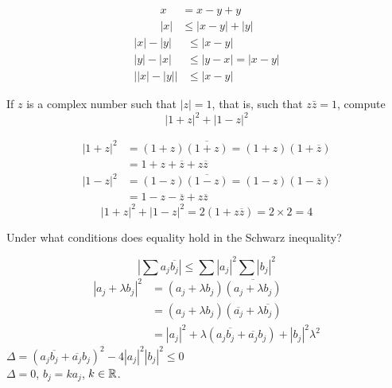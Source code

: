 \mySolve 
\begin{align*}
    x &= x - y + y \\
    |x| &\leq |x-y| + |y| 
\end{align*}
\begin{align*}
    |x| - |y| &\leq  |x-y| \\
    |y| - |x| &\leq  |y-x| = |x-y| \\
    \left| |x| - |y| \right| &\leq |x - y|
\end{align*}


\begin{myexercise}
    \label{ex:1.14}
    If $z$ is a complex number such that $|z| = 1$, that is, such that $z\bar{z} = 1$, compute
    \begin{equation*}
        |1+z|^2 + |1-z|^2
    \end{equation*}
\end{myexercise}

\mySolve
\begin{align*}
    |1+z|^2 &= (1+z)\overline{(1+z)} = (1+z)(1+\overline{z}) \\
    &= 1+z+\overline{z}+z\overline{z}
\end{align*}
\begin{align*}
    |1-z|^2 &= (1-z)\overline{(1-z)} = (1-z)(1-\overline{z}) \\
    &= 1-z-\overline{z}+z\overline{z}
\end{align*}
\begin{equation*}
    |1+z|^2 + |1-z|^2 = 2(1+z\overline{z}) = 2\times 2 = 4
\end{equation*}


\begin{myexercise}
    \label{ex:1.15}
    Under what conditions does equality hold in the Schwarz inequality?
\end{myexercise}

\mySolve
\begin{equation*}
    \left|\sum a_j \overline{b_j}\right| \leq \sum |a_j|^2 \sum |b_j|^2 
\end{equation*}
\begin{align*}
    |a_j + \lambda b_j|^2 
    &= (a_j + \lambda b_j) \overline{(a_j + \lambda b_j)} \\
    &= (a_j + \lambda b_j) (\overline{a_j} + \lambda \overline{b_j}) \\
    &= |a_j|^2 + \lambda (a_j \overline{b_j} + \overline{a_j} b_j) + |b_j|^2 \lambda^2 
\end{align*}
$\Delta = (a_j \overline{b_j} + \overline{a_j} b_j)^2 - 4|a_j|^2|b_j|^2 \leq 0$ \\
$\Delta = 0$, $b_j = k a_j$, $k \in {\protect\mathbb R}$.


